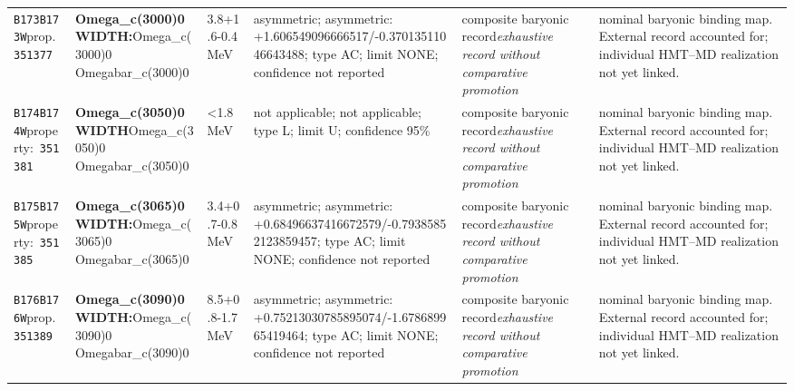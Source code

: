\begin{landscape}
\begin{longtable}{L{1.85cm}L{4.45cm}L{2.35cm}L{4.05cm}L{3.35cm}L{7.15cm}}
\texttt{B173}\newline \texttt{B173W}\newline prop.\ \texttt{351377} & \textbf{Omega\_\allowbreak{}c(3000)0 WIDTH:}\newline Omega\_\allowbreak{}c(3000)0 \textbar{}\allowbreak{} Omegabar\_\allowbreak{}c(3000)0 & 3.8+1.6-0.4\,MeV & asymmetric; asymmetric: +1.606549096666517/-0.37013511046643488; type AC; limit NONE; confidence not reported & composite baryonic record\newline \emph{exhaustive record without comparative promotion} & nominal baryonic binding map. External record accounted for; individual HMT--MD realization not yet linked. \\
\texttt{B174}\newline \texttt{B174W}\newline property:\ \texttt{351381} & \textbf{Omega\_\allowbreak{}c(3050)0 WIDTH}\newline Omega\_\allowbreak{}c(3050)0 \textbar{}\allowbreak{} Omegabar\_\allowbreak{}c(3050)0 & \textless{}1.8\,MeV & not applicable; not applicable; type L; limit U; confidence 95\% & composite baryonic record\newline \emph{exhaustive record without comparative promotion} & nominal baryonic binding map. External record accounted for; individual HMT--MD realization not yet linked. \\
\texttt{B175}\newline \texttt{B175W}\newline property:\ \texttt{351385} & \textbf{Omega\_\allowbreak{}c(3065)0 WIDTH:}\newline Omega\_\allowbreak{}c(3065)0 \textbar{}\allowbreak{} Omegabar\_\allowbreak{}c(3065)0 & 3.4+0.7-0.8\,MeV & asymmetric; asymmetric: +0.68496637416672579/-0.79385852123859457; type AC; limit NONE; confidence not reported & composite baryonic record\newline \emph{exhaustive record without comparative promotion} & nominal baryonic binding map. External record accounted for; individual HMT--MD realization not yet linked. \\
\texttt{B176}\newline \texttt{B176W}\newline prop.\ \texttt{351389} & \textbf{Omega\_\allowbreak{}c(3090)0 WIDTH:}\newline Omega\_\allowbreak{}c(3090)0 \textbar{}\allowbreak{} Omegabar\_\allowbreak{}c(3090)0 & 8.5+0.8-1.7\,MeV & asymmetric; asymmetric: +0.75213030785895074/-1.678689965419464; type AC; limit NONE; confidence not reported & composite baryonic record\newline \emph{exhaustive record without comparative promotion} & nominal baryonic binding map. External record accounted for; individual HMT--MD realization not yet linked. \\

\end{longtable}
\end{landscape}
